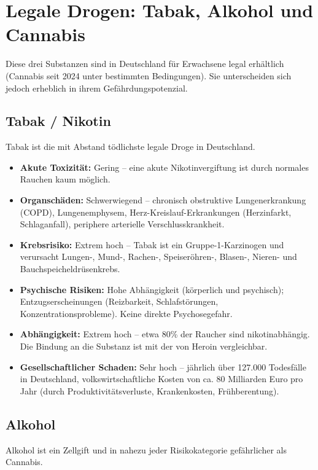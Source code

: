 \documentclass[11pt,a4paper]{article}
\begin{document}
	\section{Legale Drogen: Tabak, Alkohol und Cannabis}
	
	Diese drei Substanzen sind in Deutschland für Erwachsene legal erhältlich (Cannabis seit 2024 unter bestimmten Bedingungen). Sie unterscheiden sich jedoch erheblich in ihrem Gefährdungspotenzial.
	
	\subsection{Tabak / Nikotin}
	
	Tabak ist die mit Abstand tödlichste legale Droge in Deutschland. \cite{dhs-tabak}
	
	\begin{itemize}[leftmargin=*, noitemsep]
		\item \textbf{Akute Toxizität:} Gering – eine akute Nikotinvergiftung ist durch normales Rauchen kaum möglich.
		\item \textbf{Organschäden:} Schwerwiegend – chronisch obstruktive Lungenerkrankung (COPD), Lungenemphysem, Herz-Kreislauf-Erkrankungen (Herzinfarkt, Schlaganfall), periphere arterielle Verschlusskrankheit.
		\item \textbf{Krebsrisiko:} Extrem hoch – Tabak ist ein Gruppe-1-Karzinogen und verursacht Lungen-, Mund-, Rachen-, Speiseröhren-, Blasen-, Nieren- und Bauchspeicheldrüsenkrebs.
		\item \textbf{Psychische Risiken:} Hohe Abhängigkeit (körperlich und psychisch); Entzugserscheinungen (Reizbarkeit, Schlafstörungen, Konzentrationsprobleme). Keine direkte Psychosegefahr.
		\item \textbf{Abhängigkeit:} Extrem hoch – etwa 80\% der Raucher sind nikotinabhängig. Die Bindung an die Substanz ist mit der von Heroin vergleichbar.
		\item \textbf{Gesellschaftlicher Schaden:} Sehr hoch – jährlich über 127.000 Todesfälle in Deutschland, volkswirtschaftliche Kosten von ca. 80 Milliarden Euro pro Jahr (durch Produktivitätsverluste, Krankenkosten, Frühberentung).
	\end{itemize}
	
	\subsection{Alkohol}
	
	Alkohol ist ein Zellgift und in nahezu jeder Risikokategorie gefährlicher als Cannabis. \cite{who-carcinogen}
	
\end{document}
